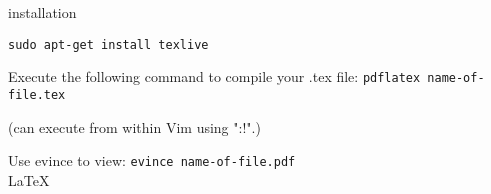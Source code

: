 \documentclass{article}
\begin{document}
installation

\texttt{sudo apt-get install texlive}

Execute the following command to compile your .tex file:
\texttt{pdflatex name-of-file.tex}


(can execute from within Vim using ":!".)

\par Use evince to view:
\texttt{evince name-of-file.pdf}
\\
\LaTeX
\end{document}
